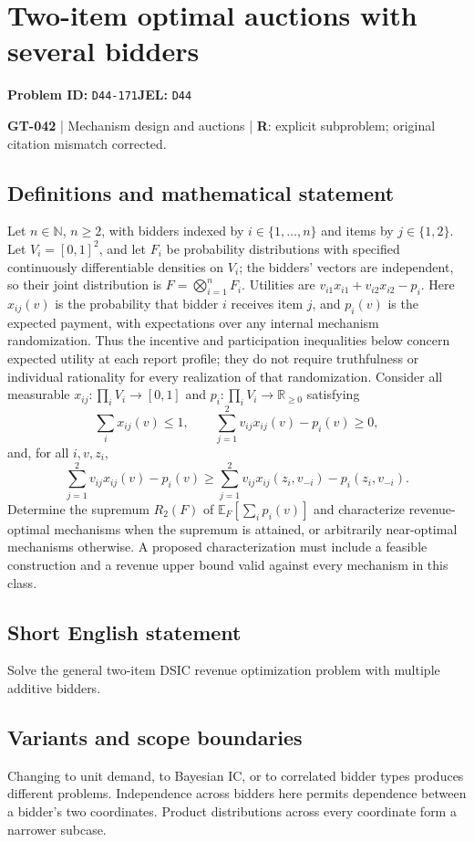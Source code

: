 \documentclass[11pt,a4paper]{article}
\newcommand{\N}{\mathbb N}
\begin{document}
\section*{Two-item optimal auctions with several bidders}
\textbf{Problem ID:} \texttt{D44-171}\quad \textbf{JEL:} \texttt{D44}\par
\label{problem:OP-0172}
\label{game:GT-042}
{\sffamily\small\color{muted}
\textbf{GT-042} | Mechanism design and auctions | \textbf{R}: explicit subproblem; original citation mismatch corrected.
\par}
\subsection*{Definitions and mathematical statement}
Let $n\in\N$, $n\geq2$, with bidders indexed by $i\in\{1,\ldots,n\}$ and items by $j\in\{1,2\}$. Let $V_i=[0,1]^2$, and let $F_i$ be probability distributions with specified continuously differentiable densities on $V_i$; the bidders' vectors are independent, so their joint distribution is $F=\bigotimes_{i=1}^n F_i$. Utilities are $v_{i1}x_{i1}+v_{i2}x_{i2}-p_i$. Here $x_{ij}(v)$ is the probability that bidder $i$ receives item $j$, and $p_i(v)$ is the expected payment, with expectations over any internal mechanism randomization. Thus the incentive and participation inequalities below concern expected utility at each report profile; they do not require truthfulness or individual rationality for every realization of that randomization. Consider all measurable $x_{ij}:\prod_iV_i\to[0,1]$ and $p_i:\prod_iV_i\to\mathbb R_{\geq0}$ satisfying
\[
 \sum_i x_{ij}(v)\leq1,\qquad
 \sum_{j=1}^2v_{ij}x_{ij}(v)-p_i(v)\geq0,
\]
and, for all $i,v,z_i$,
\[
 \sum_{j=1}^2v_{ij}x_{ij}(v)-p_i(v)
 \geq\sum_{j=1}^2v_{ij}x_{ij}(z_i,v_{-i})-p_i(z_i,v_{-i}).
\]
Determine the supremum $R_2(F)$ of $\mathbb E_F[\sum_i p_i(v)]$ and characterize revenue-optimal mechanisms when the supremum is attained, or arbitrarily near-optimal mechanisms otherwise. A proposed characterization must include a feasible construction and a revenue upper bound valid against every mechanism in this class.
\subsection*{Short English statement}
Solve the general two-item DSIC revenue optimization problem with multiple additive bidders.
\subsection*{Variants and scope boundaries}
Changing to unit demand, to Bayesian IC, or to correlated bidder types produces different problems. Independence across bidders here permits dependence between a bidder's two coordinates. Product distributions across every coordinate form a narrower subcase.
\end{document}
